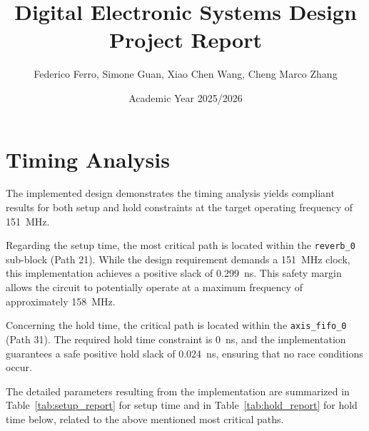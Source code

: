 \documentclass[11pt]{article}
\title{Digital Electronic Systems Design Project Report}
\author{Federico Ferro, Simone Guan, Xiao Chen Wang, Cheng Marco Zhang}
\date{Academic Year 2025/2026}
\begin{document}
\maketitle


\section*{Timing Analysis}

The implemented design demonstrates the timing analysis yields compliant results for both setup and hold constraints at the target operating frequency of 151~MHz.

Regarding the setup time, the most critical path is located within the \texttt{reverb\_0} sub-block (Path 21). While the design requirement demands a 151~MHz clock, this implementation achieves a positive slack of 0.299~ns. This safety margin allows the circuit to potentially operate at a maximum frequency of approximately 158~MHz.

Concerning the hold time, the critical path is located within the \texttt{axis\_fifo\_0} (Path 31). The required hold time constraint is 0~ns, and the implementation guarantees a safe positive hold slack of 0.024~ns, ensuring that no race conditions occur.

The detailed parameters resulting from the implementation are summarized in Table~\ref{tab:setup_report} for setup time and in Table~\ref{tab:hold_report} for hold time below, related to the above mentioned most critical paths.
\end{document}

